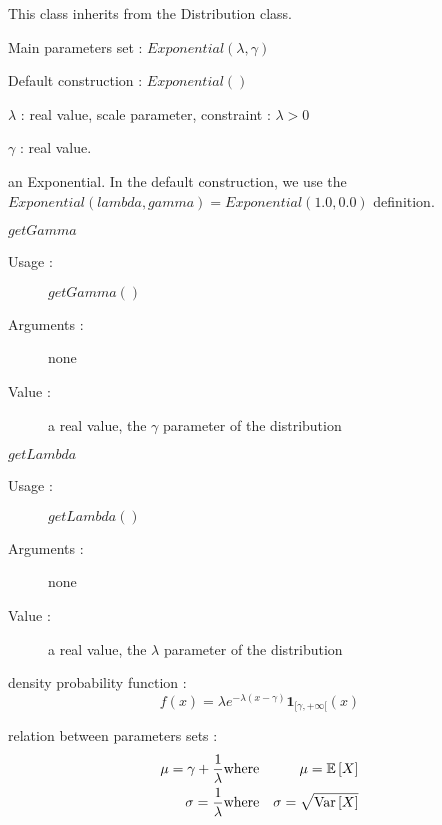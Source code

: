 This class inherits from the Distribution class.

\begin{description}

\item[Usage :]
  \begin{description}
  \item Main parameters set : $Exponential(\lambda,\gamma)$
  \item Default construction : $Exponential( )$
  \end{description}

\item[Arguments :]  \rule{0pt}{1em}
  \begin{description}
  \item $\lambda$ : real value, scale parameter, constraint : $\lambda > 0 $
  \item $\gamma$ :  real value.
  \end{description}

\item[Value :] an Exponential. In the default construction, we use the $Exponential(lambda, gamma) = Exponential(1.0, 0.0)$ definition.

\item[Some methods :]  \rule{0pt}{1em}
  \begin{description}

  \item $getGamma$
    \begin{description}
    \item[Usage :] $getGamma()$
    \item[Arguments :] none
    \item[Value :]  a real value, the $\gamma$ parameter of the  distribution
    \end{description}
    \bigskip

  \item $getLambda$
    \begin{description}
    \item[Usage :] $getLambda()$
    \item[Arguments :] none
    \item[Value :]  a real value, the $\lambda$ parameter of the  distribution
    \end{description}
    \bigskip
  \end{description}



\item[Details :]  \rule{0pt}{1em}
  \begin{description}
  \item density probability function :
    $$
    f(x) = \displaystyle \lambda e^{-\lambda(x-\gamma)}\boldsymbol{1}_{[\gamma,+\infty[}(x)
    $$
  \item relation between parameters sets :
    \begin{eqnarray*}
      \mu = \gamma + \frac{1}{\lambda}                                   &  \mbox{where}& \mu ={\mathbb E}\left[ X \right]\\
      \sigma = \frac{1}{\lambda} &  \mbox{where}& \sigma =\sqrt{{\rm Var}\left[ X \right] }
    \end{eqnarray*}


\end{description}
\end{description}
